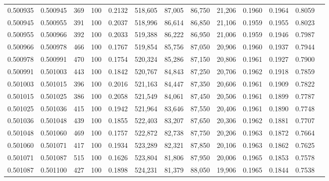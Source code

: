 \begin{tabular}{rrrrrrrrrrrrr}
0.500935 & 0.500945 &   369 & 100 &                                     0.2132 & 518,605 &  87,005 &  86,750 &  21,206 & 0.1960 & 0.1964 & 0.8059 \\
0.500945 & 0.500955 &   391 & 100 &                                     0.2037 & 518,996 &  86,614 &  86,850 &  21,106 & 0.1959 & 0.1955 & 0.8023 \\
0.500955 & 0.500966 &   392 & 100 &                                     0.2033 & 519,388 &  86,222 &  86,950 &  21,006 & 0.1959 & 0.1946 & 0.7987 \\
0.500966 & 0.500978 &   466 & 100 &                                     0.1767 & 519,854 &  85,756 &  87,050 &  20,906 & 0.1960 & 0.1937 & 0.7944 \\
0.500978 & 0.500991 &   470 & 100 &                                     0.1754 & 520,324 &  85,286 &  87,150 &  20,806 & 0.1961 & 0.1927 & 0.7900 \\
0.500991 & 0.501003 &   443 & 100 &                                     0.1842 & 520,767 &  84,843 &  87,250 &  20,706 & 0.1962 & 0.1918 & 0.7859 \\
0.501003 & 0.501015 &   396 & 100 &                                     0.2016 & 521,163 &  84,447 &  87,350 &  20,606 & 0.1961 & 0.1909 & 0.7822 \\
0.501015 & 0.501025 &   386 & 100 &                                     0.2058 & 521,549 &  84,061 &  87,450 &  20,506 & 0.1961 & 0.1899 & 0.7787 \\
0.501025 & 0.501036 &   415 & 100 &                                     0.1942 & 521,964 &  83,646 &  87,550 &  20,406 & 0.1961 & 0.1890 & 0.7748 \\
0.501036 & 0.501048 &   439 & 100 &                                     0.1855 & 522,403 &  83,207 &  87,650 &  20,306 & 0.1962 & 0.1881 & 0.7707 \\
0.501048 & 0.501060 &   469 & 100 &                                     0.1757 & 522,872 &  82,738 &  87,750 &  20,206 & 0.1963 & 0.1872 & 0.7664 \\
0.501060 & 0.501071 &   417 & 100 &                                     0.1934 & 523,289 &  82,321 &  87,850 &  20,106 & 0.1963 & 0.1862 & 0.7625 \\
0.501071 & 0.501087 &   515 & 100 &                                     0.1626 & 523,804 &  81,806 &  87,950 &  20,006 & 0.1965 & 0.1853 & 0.7578 \\
0.501087 & 0.501100 &   427 & 100 &                                     0.1898 & 524,231 &  81,379 &  88,050 &  19,906 & 0.1965 & 0.1844 & 0.7538 \\

\end{tabular}
